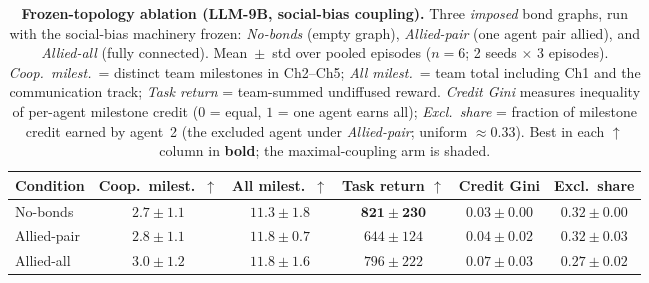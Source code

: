 \begin{table}[t]
\centering
\caption{\textbf{Frozen-topology ablation (LLM-9B, social-bias coupling).}
Three \emph{imposed} bond graphs, run with the social-bias machinery frozen:
\emph{No-bonds} (empty graph), \emph{Allied-pair} (one agent pair allied),
and \emph{Allied-all} (fully connected). Mean~$\pm$~std over pooled episodes
($n{=}6$; 2 seeds $\times$ 3 episodes). \emph{Coop.\ milest.}\ = distinct
team milestones in Ch2--Ch5; \emph{All milest.}\ = team total including Ch1
and the communication track; \emph{Task return} = team-summed undiffused
reward. \emph{Credit Gini} measures inequality of per-agent milestone credit
($0$ = equal, $1$ = one agent earns all); \emph{Excl.\ share} = fraction of
milestone credit earned by agent~2 (the excluded agent under
\emph{Allied-pair}; uniform $\approx 0.33$). Best in each $\uparrow$ column in
\textbf{bold}; the maximal-coupling arm is shaded.}
\label{tab:topology_ablation}
\small
\begin{tabular}{lccccc}
\toprule
Condition & Coop.\ milest.\ $\uparrow$ & All milest.\ $\uparrow$ &
Task return $\uparrow$ & Credit Gini & Excl.\ share \\
\midrule
No-bonds     & $2.7 \pm 1.1$ & $11.3 \pm 1.8$          & $\mathbf{821 \pm 230}$ & $0.03 \pm 0.00$ & $0.32 \pm 0.00$ \\
Allied-pair  & $2.8 \pm 1.1$ & $\mathbf{11.8 \pm 0.7}$ & $644 \pm 124$          & $0.04 \pm 0.02$ & $0.32 \pm 0.03$ \\
\rowcolor{gray!12}
Allied-all   & $\mathbf{3.0 \pm 1.2}$ & $\mathbf{11.8 \pm 1.6}$ & $796 \pm 222$ & $0.07 \pm 0.03$ & $0.27 \pm 0.02$ \\
\bottomrule
\end{tabular}
\end{table}
